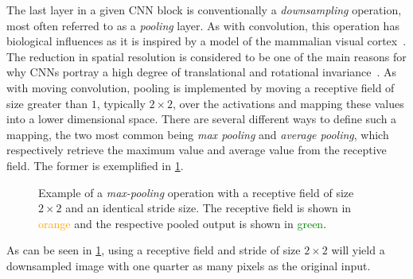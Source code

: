 The last layer in a given CNN block is conventionally a \textit{downsampling} operation, most often referred to as a \textit{pooling} layer.
As with convolution, this operation has biological influences as it is inspired by a model of the mammalian visual cortex~\cite[p.~966]{visint-cnn}.
The reduction in spatial resolution is considered to be one of the main reasons for why CNNs portray a high degree of translational and rotational invariance~\cite{cnn-translational-invariance}.
As with moving convolution, pooling is implemented by moving a receptive field of size greater than $1$, typically $2 \times 2$, over the activations and mapping these values into a lower dimensional space.
There are several different ways to define such a mapping, the two most common being \textit{max pooling} and \textit{average pooling}, which respectively retrieve the maximum value and average value from the receptive field.
The former is exemplified in \cref{fig:max-pooling}.

\begin{figure}[H]
  
  \caption{%
    Example of a \textit{max-pooling} operation with a receptive field of size $2 \times 2$ and an identical stride size.
    The receptive field is shown in \textcolor{orange}{orange} and the respective pooled output is shown in \textcolor{green}{green}.
  }%
  \label{fig:max-pooling}
\end{figure}

As can be seen in \cref{fig:max-pooling}, using a receptive field and stride of size $2 \times 2$ will yield a downsampled image with one quarter as many pixels as the original input.
